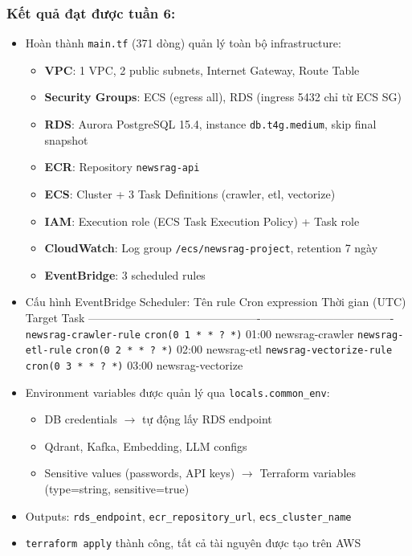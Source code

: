 \hypertarget{kux1ebft-quux1ea3-ux111ux1ea1t-ux111ux1b0ux1ee3c-tuux1ea7n-6}{%
\subsubsection{Kết quả đạt được tuần
6:}}

\begin{itemize}
\item
  Hoàn thành \texttt{main.tf} (371 dòng) quản lý toàn bộ infrastructure:

  \begin{itemize}
  \tightlist
  \item
    \textbf{VPC}: 1 VPC, 2 public subnets, Internet Gateway, Route Table
  \item
    \textbf{Security Groups}: ECS (egress all), RDS (ingress 5432 chỉ từ
    ECS SG)
  \item
    \textbf{RDS}: Aurora PostgreSQL 15.4, instance
    \texttt{db.t4g.medium}, skip final snapshot
  \item
    \textbf{ECR}: Repository \texttt{newsrag-api}
  \item
    \textbf{ECS}: Cluster + 3 Task Definitions (crawler, etl, vectorize)
  \item
    \textbf{IAM}: Execution role (ECS Task Execution Policy) + Task role
  \item
    \textbf{CloudWatch}: Log group \texttt{/ecs/newsrag-project},
    retention 7 ngày
  \item
    \textbf{EventBridge}: 3 scheduled rules
  \end{itemize}
\item
  Cấu hình EventBridge Scheduler: \textbar{} Tên rule \textbar{} Cron
  expression \textbar{} Thời gian (UTC) \textbar{} Target Task
  \textbar{}
  \textbar------------------------\textbar----------------------\textbar-----------------\textbar-------------------\textbar{}
  \textbar{} \texttt{newsrag-crawler-rule} \textbar{}
  \texttt{cron(0\ 1\ *\ *\ ?\ *)} \textbar{} 01:00 \textbar{}
  newsrag-crawler \textbar{} \textbar{} \texttt{newsrag-etl-rule}
  \textbar{} \texttt{cron(0\ 2\ *\ *\ ?\ *)} \textbar{} 02:00 \textbar{}
  newsrag-etl \textbar{} \textbar{}
  \texttt{newsrag-vectorize-rule}\textbar{}
  \texttt{cron(0\ 3\ *\ *\ ?\ *)} \textbar{} 03:00 \textbar{}
  newsrag-vectorize \textbar{}
\item
  Environment variables được quản lý qua \texttt{locals.common\_env}:

  \begin{itemize}
  \tightlist
  \item
    DB credentials \(\rightarrow\) tự động lấy RDS endpoint
  \item
    Qdrant, Kafka, Embedding, LLM configs
  \item
    Sensitive values (passwords, API keys) \(\rightarrow\) Terraform
    variables (type=string, sensitive=true)
  \end{itemize}
\item
  Outputs: \texttt{rds\_endpoint}, \texttt{ecr\_repository\_url},
  \texttt{ecs\_cluster\_name}
\item
  \texttt{terraform\ apply} thành công, tất cả tài nguyên được tạo trên
  AWS
\end{itemize}
